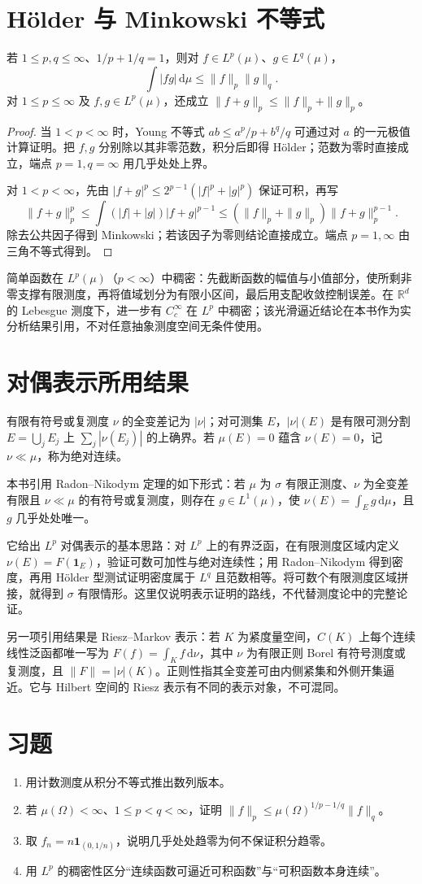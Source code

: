 \section{Hölder 与 Minkowski 不等式}
\begin{proposition}\label{prop:fa-holder-minkowski}
若 $1\leq p,q\leq\infty$、$1/p+1/q=1$，则对 $f\in L^p(\mu)$、$g\in L^q(\mu)$，
\[
 \int|fg|\,\mathrm d\mu\leq\|f\|_p\|g\|_q.
\]
对 $1\leq p\leq\infty$ 及 $f,g\in L^p(\mu)$，还成立 $\|f+g\|_p\leq\|f\|_p+\|g\|_p$。
\end{proposition}
\begin{proof}
当 $1<p<\infty$ 时，Young 不等式 $ab\leq a^p/p+b^q/q$ 可通过对 $a$ 的一元极值计算证明。把 $f,g$ 分别除以其非零范数，积分后即得 Hölder；范数为零时直接成立，端点 $p=1,q=\infty$ 用几乎处处上界。

对 $1<p<\infty$，先由 $|f+g|^p\leq2^{p-1}(|f|^p+|g|^p)$ 保证可积，再写
\[
 \|f+g\|_p^p
 \leq\int(|f|+|g|)|f+g|^{p-1}
 \leq(\|f\|_p+\|g\|_p)\|f+g\|_p^{p-1}.
\]
除去公共因子得到 Minkowski；若该因子为零则结论直接成立。端点 $p=1,\infty$ 由三角不等式得到。
\end{proof}
简单函数在 $L^p(\mu)$（$p<\infty$）中稠密：先截断函数的幅值与小值部分，使所剩非零支撑有限测度，再将值域划分为有限小区间，最后用支配收敛控制误差。在 $\mathbb R^d$ 的 Lebesgue 测度下，进一步有 $C_c^\infty$ 在 $L^p$ 中稠密；该光滑逼近结论在本书作为实分析结果引用，不对任意抽象测度空间无条件使用。

\section{对偶表示所用结果}
有限有符号或复测度 $\nu$ 的全变差记为 $|\nu|$；对可测集 $E$，$|\nu|(E)$ 是有限可测分割 $E=\bigcup_jE_j$ 上 $\sum_j|\nu(E_j)|$ 的上确界。若 $\mu(E)=0$ 蕴含 $\nu(E)=0$，记 $\nu\ll\mu$，称为绝对连续。

本书引用 Radon--Nikodym 定理的如下形式：若 $\mu$ 为 $\sigma$ 有限正测度、$\nu$ 为全变差有限且 $\nu\ll\mu$ 的有符号或复测度，则存在 $g\in L^1(\mu)$，使 $\nu(E)=\int_Eg\,\mathrm d\mu$，且 $g$ 几乎处处唯一。

它给出 $L^p$ 对偶表示的基本思路：对 $L^p$ 上的有界泛函，在有限测度区域内定义 $\nu(E)=F(\mathbf1_E)$，验证可数可加性与绝对连续性；用 Radon--Nikodym 得到密度，再用 Hölder 型测试证明密度属于 $L^q$ 且范数相等。将可数个有限测度区域拼接，就得到 $\sigma$ 有限情形。这里仅说明表示证明的路线，不代替测度论中的完整论证。

另一项引用结果是 Riesz--Markov 表示：若 $K$ 为紧度量空间，$C(K)$ 上每个连续线性泛函都唯一写为 $F(f)=\int_Kf\,\mathrm d\nu$，其中 $\nu$ 为有限正则 Borel 有符号测度或复测度，且 $\|F\|=|\nu|(K)$。正则性指其全变差可由内侧紧集和外侧开集逼近。它与 Hilbert 空间的 Riesz 表示有不同的表示对象，不可混同。

\section{习题}
\begin{enumerate}
 \item 用计数测度从积分不等式推出数列版本。
 \item 若 $\mu(\Omega)<\infty$、$1\leq p<q<\infty$，证明 $\|f\|_p\leq\mu(\Omega)^{1/p-1/q}\|f\|_q$。
 \item 取 $f_n=n\mathbf1_{(0,1/n)}$，说明几乎处处趋零为何不保证积分趋零。
 \item 用 $L^p$ 的稠密性区分“连续函数可逼近可积函数”与“可积函数本身连续”。
\end{enumerate}

